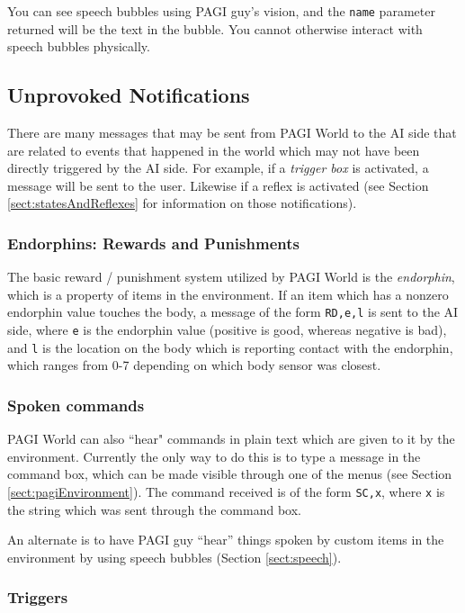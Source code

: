 You can see speech bubbles using PAGI guy's vision, and the \texttt{name} parameter returned will be the text in the bubble. You cannot otherwise interact with speech bubbles physically.

\subsection{Unprovoked Notifications}

There are many messages that may be sent from PAGI World to the AI side that are related to events that happened in the world which may not have been directly triggered by the AI side. For example, if a \textit{trigger box} is activated, a message will be sent to the user. Likewise if a reflex is activated (see Section \ref{sect:statesAndReflexes} for information on those notifications).

\subsubsection{Endorphins: Rewards and Punishments}

The basic reward / punishment system utilized by PAGI World is the \textit{endorphin}, which is a property of items in the environment. If an item which has a nonzero endorphin value touches the body, a message of the form \texttt{RD,e,l} is sent to the AI side, where \texttt{e} is the endorphin value (positive is good, whereas negative is bad), and \texttt{l} is the location on the body which is reporting contact with the endorphin, which ranges from 0-7 depending on which body sensor was closest.

\subsubsection{Spoken commands}

PAGI World can also ``hear" commands in plain text which are given to it by the environment. Currently the only way to do this is to type a message in the command box, which can be made visible through one of the menus (see Section \ref{sect:pagiEnvironment}). The command received is of the form \texttt{SC,x}, where \texttt{x} is the string which was sent through the command box. 

An alternate is to have PAGI guy ``hear'' things spoken by custom items in the environment by using speech bubbles (Section \ref{sect:speech}).

\subsubsection{Triggers}

